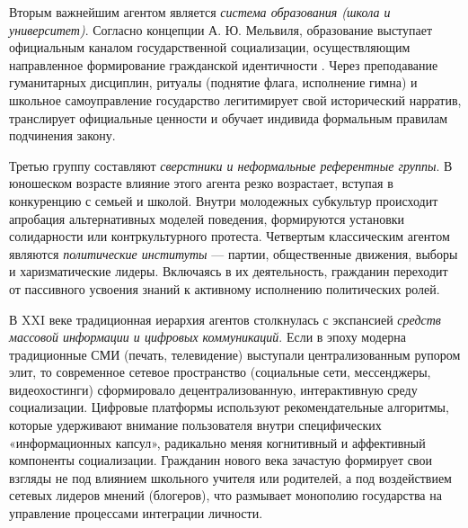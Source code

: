 Вторым важнейшим агентом является \textit{система образования (школа и университет)}. Согласно концепции А. Ю. Мельвиля, образование выступает официальным каналом государственной социализации, осуществляющим направленное формирование гражданской идентичности \cite{Melville}. Через преподавание гуманитарных дисциплин, ритуалы (поднятие флага, исполнение гимна) и школьное самоуправление государство легитимирует свой исторический нарратив, транслирует официальные ценности и обучает индивида формальным правилам подчинения закону.

Третью группу составляют \textit{сверстники и неформальные референтные группы}. В юношеском возрасте влияние этого агента резко возрастает, вступая в конкуренцию с семьей и школой. Внутри молодежных субкультур происходит апробация альтернативных моделей поведения, формируются установки солидарности или контркультурного протеста. Четвертым классическим агентом являются \textit{политические институты} --- партии, общественные движения, выборы и харизматические лидеры. Включаясь в их деятельность, гражданин переходит от пассивного усвоения знаний к активному исполнению политических ролей.

В XXI веке традиционная иерархия агентов столкнулась с экспансией \textit{средств массовой информации и цифровых коммуникаций}. Если в эпоху модерна традиционные СМИ (печать, телевидение) выступали централизованным рупором элит, то современное сетевое пространство (социальные сети, мессенджеры, видеохостинги) сформировало децентрализованную, интерактивную среду социализации. Цифровые платформы используют рекомендательные алгоритмы, которые удерживают внимание пользователя внутри специфических «информационных капсул», радикально меняя когнитивный и аффективный компоненты социализации. Гражданин нового века зачастую формирует свои взгляды не под влиянием школьного учителя или родителей, а под воздействием сетевых лидеров мнений (блогеров), что размывает монополию государства на управление процессами интеграции личности.